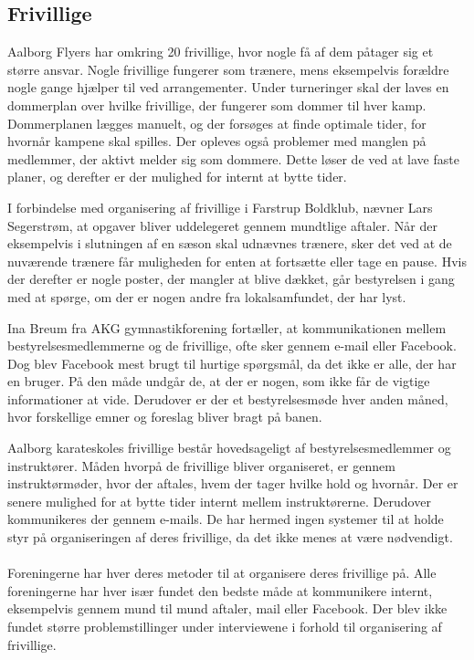 \subsection*{Frivillige}
Aalborg Flyers har omkring 20 frivillige, hvor nogle få af dem påtager sig et større ansvar. Nogle frivillige fungerer som trænere, mens eksempelvis forældre nogle gange hjælper til ved arrangementer. Under turneringer skal der laves en dommerplan over hvilke frivillige, der fungerer som dommer til hver kamp. Dommerplanen lægges manuelt, og der forsøges at finde optimale tider, for hvornår kampene skal spilles. Der opleves også problemer med manglen på medlemmer, der aktivt melder sig som dommere. Dette løser de ved at lave faste planer, og derefter er der mulighed for internt at bytte tider.
\par
I forbindelse med organisering af frivillige i Farstrup Boldklub, nævner Lars Segerstrøm, at opgaver bliver uddelegeret gennem mundtlige aftaler. Når der eksempelvis i slutningen af en sæson skal udnævnes trænere, sker det ved at de nuværende trænere får muligheden for enten at fortsætte eller tage en pause. Hvis der derefter er nogle poster, der mangler at blive dækket, går bestyrelsen i gang med at spørge, om der er nogen andre fra lokalsamfundet, der har lyst.
\par
Ina Breum fra AKG gymnastikforening fortæller, at kommunikationen mellem bestyrelsesmedlemmerne og de frivillige, ofte sker gennem e-mail eller Facebook. Dog blev Facebook mest brugt til hurtige spørgsmål, da det ikke er alle, der har en bruger. På den måde undgår de, at der er nogen, som ikke får de vigtige informationer at vide. Derudover er der et bestyrelsesmøde hver anden måned, hvor forskellige emner og foreslag bliver bragt på banen.
\par %
Aalborg karateskoles frivillige består hovedsageligt af bestyrelsesmedlemmer og instruktører. Måden hvorpå de frivillige bliver organiseret, er gennem instruktørmøder, hvor der aftales, hvem der tager hvilke hold og hvornår. Der er senere mulighed for at bytte tider internt mellem instruktørerne. Derudover kommunikeres der gennem e-mails. De har hermed ingen systemer til at holde styr på organiseringen af deres frivillige, da det ikke menes at være nødvendigt.
\\\\
Foreningerne har hver deres metoder til at organisere deres frivillige på. Alle foreningerne har hver især fundet den bedste måde at kommunikere internt, eksempelvis gennem mund til mund aftaler, mail eller Facebook. Der blev ikke fundet større problemstillinger under interviewene i forhold til organisering af frivillige.

